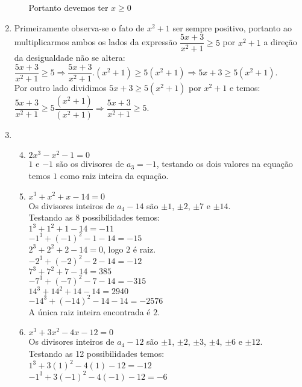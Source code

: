 \documentclass[10pt]{book}
\begin{document}
\begin{enumerate}
\begin{enumerate}
		Portanto devemos ter $x \geq 0$
	\end{enumerate}
	\item %
	Primeiramente observa-se o fato de $x^2+1$ ser sempre positivo, portanto ao multiplicarmos ambos os lados da expressão $\dfrac{5x+3}{x^2+1} \geq 5$ por $x^2 + 1$ a direção da desigualdade não se altera:\\[6pt]
	$\dfrac{5x+3}{x^2+1} \geq 5 \Rightarrow \dfrac{5x+3}{x^2+1}.(x^2+1) \geq 5(x^2+1) \Rightarrow 5x+3 \geq 5(x^2+1)$.\\[6pt]
	Por outro lado dividimos $5x+3 \geq 5(x^2+1)$ por $x^2+1$ e temos:\\[6pt]
	$\dfrac{5x+3}{x^2+1} \geq 5\dfrac{(x^2+1)}{(x^2+1)} \Rightarrow \dfrac{5x+3}{x^2+1} \geq 5$.
	\setcounter{enumi}{16}
	\item %
		\begin{enumerate}
			\setcounter{enumii}{3}
			\item  %
			$2x^3-x^2-1=0$\\
			$1$ e $-1$ são os divisores de $a_{3}=-1$, testando os dois valores na equação temos $1$ como raiz inteira da equação.
			\item  %
			$x^3+x^2+x-14=0$\\
			Os divisores inteiros de $a_{4}-14$ são $\pm1$, $\pm2$, $\pm7$ e $\pm14$.\\
			Testando as 8 possibilidades temos:\\
			$1^3+1^2+1-14=-11$\\
			$-1^3+(-1)^2-1-14=-15$\\
			$2^3+2^2+2-14=0$, logo $2$ é raiz.\\
			$-2^3+(-2)^2-2-14=-12$\\
			$7^3+7^2+7-14=385$\\
			$-7^3+(-7)^2-7-14=-315$\\
			$14^3+14^2+14-14=2940$\\
			$-14^3+(-14)^2-14-14=-2576$\\
			A única raiz inteira encontrada é $2$.
			\item  %
			$x^3+3x^2-4x-12=0$\\
			Os divisores inteiros de $a_{4}-12$ são $\pm1$, $\pm2$, $\pm3$, $\pm4$, $\pm6$ e $\pm12$.\\
			Testando as 12 possibilidades temos:\\
			$1^3+3(1)^2-4(1)-12=-12$\\
			$-1^3+3(-1)^2-4(-1)-12=-6$\\

\end{enumerate}
\end{enumerate}
\end{document}
